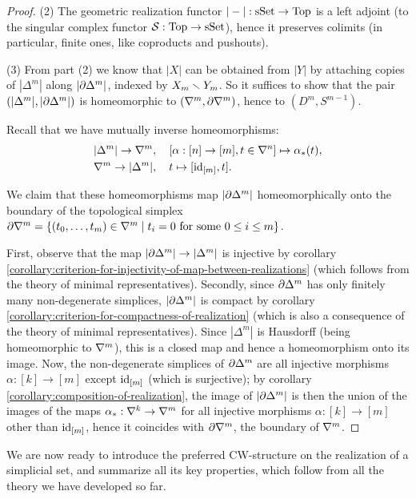 \begin{proof}
(2) The geometric realization functor $|-|:{\mathrm{sSet}}\to{\mathrm{Top}}$ is a left adjoint (to the singular complex functor $\mathcal{S}:{\mathrm{Top}}\to{\mathrm{sSet}}$), hence it preserves colimits (in particular, finite ones, like coproducts and pushouts).

(3) From part (2) we know that $|X|$ can be obtained from $|Y|$ by attaching copies of $|\Delta^m|$ along $|\partial\Delta^m|$, indexed by $X_m\smallsetminus Y_m$. So it suffices to show that the pair $(|\Delta^m|,|\partial\Delta^m|)$ is homeomorphic to $(\nabla^{m},\partial\nabla^{m})$, hence to $(D^m,S^{m-1})$.

Recall that we have mutually inverse homeomorphisms:
\begin{align*}
    |\Delta^m|\to\nabla^{m}&,\quad [\alpha:[n]\to[m],t\in\nabla^n]\mapsto\alpha_*(t),\\
    \nabla^{m}\to|\Delta^m|&,\quad t\mapsto[\operatorname{id}_{[m]},t].
\end{align*}

We claim that these homeomorphisms map $|\partial\Delta^m|$ homeomorphically onto the boundary of the topological simplex $\partial\nabla^{m}=\{({{t}_0,\dots,{t}_{m}})\in\nabla^{m}\mid t_i=0\text{ for some }0\le i\le m\}$.

First, observe that the map $|\partial\Delta^m|\to|\Delta^m|$ is injective by corollary \ref{corollary:criterion-for-injectivity-of-map-between-realizations} (which follows from the theory of minimal representatives). Secondly, since $\partial\Delta^m$ has only finitely many non-degenerate simplices, $|\partial\Delta^m|$ is compact by corollary \ref{corollary:criterion-for-compactness-of-realization} (which is also a consequence of the theory of minimal representatives). Since $|\Delta^m|$ is Hausdorff (being homeomorphic to $\nabla^{m}$), this is a closed map and hence a homeomorphism onto its image. Now, the non-degenerate simplices of $\partial\Delta^m$ are all injective morphisms $\alpha:[k]\to[m]$ except $\operatorname{id}_{[m]}$ (which is surjective); by corollary \ref{corollary:composition-of-realization}, the image of $|\partial\Delta^m|$ is then the union of the images of the maps $\alpha_*:\nabla^{k}\to\nabla^{m}$ for all injective morphisms $\alpha:[k]\to[m]$ other than $\operatorname{id}_{[m]}$, hence it coincides with $\partial\nabla^{m}$, the boundary of $\nabla^{m}$.
\end{proof}

We are now ready to introduce the preferred CW-structure on the realization of a simplicial set, and summarize all its key properties, which follow from all the theory we have developed so far.

